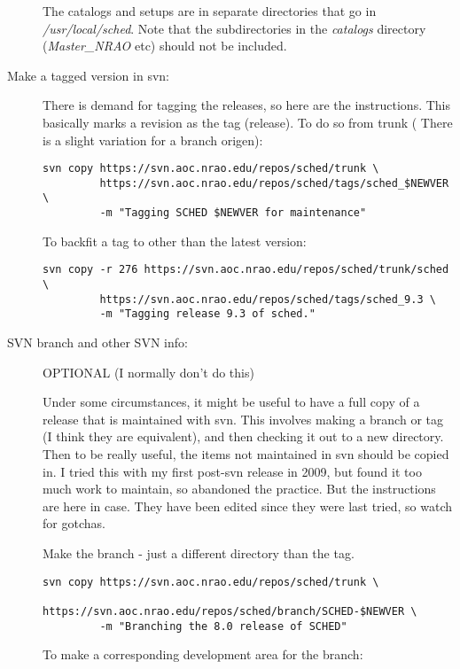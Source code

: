 \documentclass{report}
\begin{document}
\begin{description}
The catalogs and setups are in separate directories that go in {\sl
/usr/local/sched}.  Note that the subdirectories in the {\sl catalogs}
directory ({\sl Master\_NRAO} etc) should not be included.


\item [Make a tagged version in svn:]

There is demand for tagging the releases, so here are the instructions.
This basically marks a revision as the tag (release).
To do so from trunk ( There is a slight variation for a branch origen):

\begin{verbatim}
svn copy https://svn.aoc.nrao.edu/repos/sched/trunk \
         https://svn.aoc.nrao.edu/repos/sched/tags/sched_$NEWVER \
         -m "Tagging SCHED $NEWVER for maintenance"
\end{verbatim}

To backfit a tag to other than the latest version:

\begin{verbatim}
svn copy -r 276 https://svn.aoc.nrao.edu/repos/sched/trunk/sched \
         https://svn.aoc.nrao.edu/repos/sched/tags/sched_9.3 \
         -m "Tagging release 9.3 of sched."
\end{verbatim}


\item [SVN branch and other SVN info:]

OPTIONAL (I normally don't do this)

Under some circumstances, it might be useful to have a full copy of a
release that is maintained with svn.  This involves making a branch
or tag (I think they are equivalent), and then checking it out to 
a new directory.  Then to be really useful, the items not maintained
in svn should be copied in.  I tried this with my first post-svn 
release in 2009, but found it too much work to maintain, so abandoned the
practice.  But the instructions are here in case.  They have been
edited since they were last tried, so watch for gotchas.

Make the branch - just a different directory than the tag.

\begin{verbatim}
svn copy https://svn.aoc.nrao.edu/repos/sched/trunk \
         https://svn.aoc.nrao.edu/repos/sched/branch/SCHED-$NEWVER \
         -m "Branching the 8.0 release of SCHED"
\end{verbatim}

To make a corresponding development area for the branch:


\end{description}
\end{document}

